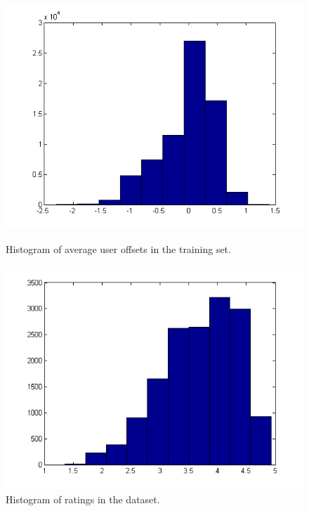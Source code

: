 \documentclass[12pt]{article}
\begin{document}
\begin{figure}[!h]
\begin{minipage}[t]{.48\textwidth}
  \centering
  \includegraphics[width=.8\linewidth]{user_offsets.png}
  \caption{Histogram of average user offsets in the training set.}
	\label{fig:user_offsets}
\end{minipage}%
\hfill
\begin{minipage}[t]{.48\textwidth}
  \centering
  \includegraphics[width=.8\linewidth]{hist_ratings.png}
  \caption{Histogram of ratings in the dataset.}
	\label{fig:hist_ratings}
\end{minipage}
\end{figure}


\newpage 
\begin{table}[htbp]
  \centering{}\caption {Best, worst and overall performance of cluster factorization.}\label{clustersFact}
\end{table}%
\end{document}
